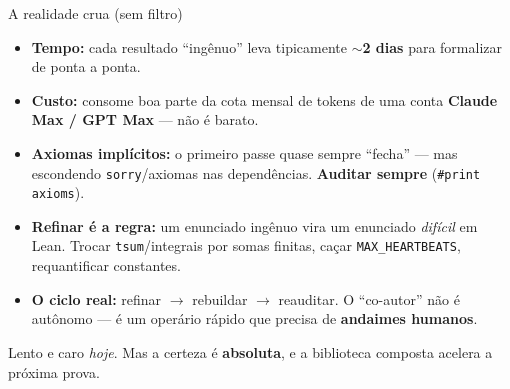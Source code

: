 \documentclass[10pt,aspectratio=169]{beamer}
\newcommand{\hl}[1]{{\color{accent}\textbf{#1}}}
\newcommand{\hlo}[1]{{\color{accent3}\textbf{#1}}}
\begin{document}
\begin{frame}{A realidade crua (sem filtro)}
  \begin{itemize}\small
    \setlength{\itemsep}{0.55em}
    \item \hlo{Tempo:} cada resultado ``ingênuo'' leva tipicamente
          \hl{$\sim$2 dias} para formalizar de ponta a ponta.
    \pause
    \item \hlo{Custo:} consome boa parte da cota mensal de tokens de
          uma conta \hl{Claude Max / GPT Max} --- não é barato.
    \pause
    \item \hlo{Axiomas implícitos:} o primeiro passe quase sempre
          ``fecha'' --- mas escondendo \texttt{sorry}/axiomas nas
          dependências. \hl{Auditar sempre} (\texttt{\#print axioms}).
    \pause
    \item \hlo{Refinar é a regra:} um enunciado ingênuo vira um
          enunciado \emph{difícil} em Lean. Trocar
          \texttt{tsum}/integrais por somas finitas, caçar
          \texttt{MAX\_HEARTBEATS}, requantificar constantes.
    \pause
    \item \hlo{O ciclo real:} refinar $\to$ rebuildar $\to$ reauditar.
          O ``co-autor'' não é autônomo --- é um operário rápido que
		 precisa de \hl{andaimes humanos}.
  \end{itemize}
  \vspace{0.4em}
  \pause
  \begin{center}\color{fgmute}\small
    Lento e caro \emph{hoje}. Mas a certeza é \hl{absoluta}, e a
    biblioteca composta acelera a próxima prova.
  \end{center}
\end{frame}
\end{document}
